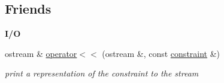 \subsection*{Friends}
\begin{Indent}\textbf{ I/O}\par
\begin{DoxyCompactItemize}
\item 
ostream \& \hyperlink{classconstraint_a829b1dbba361c34d021ebe82ccf5cb7f}{operator$<$$<$} (ostream \&, const \hyperlink{classconstraint}{constraint} \&)
\begin{DoxyCompactList}\small\item\em print a representation of the constraint to the stream \end{DoxyCompactList}\end{DoxyCompactItemize}
\end{Indent}
